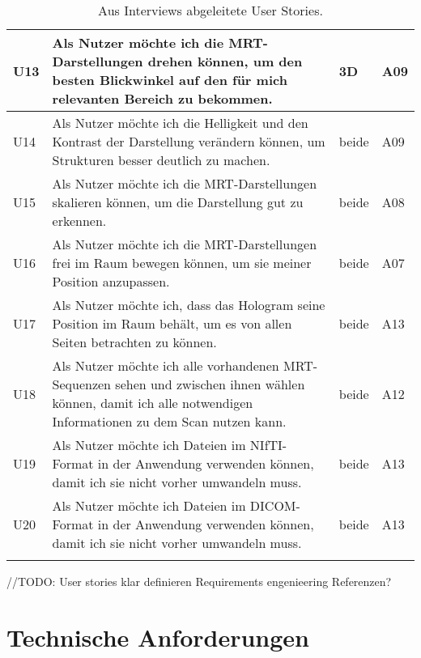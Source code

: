 \begin{longtable} {p{}p{}p{}p{}}
\midrule 
U13 & Als Nutzer möchte ich die MRT-Darstellungen drehen können, um den besten Blickwinkel auf den für mich relevanten Bereich zu bekommen. & 3D & A09\\
\midrule 
U14 & Als Nutzer möchte ich die Helligkeit und den Kontrast der Darstellung verändern können, um Strukturen besser deutlich zu machen. & beide & A09\\
\midrule 
U15 & Als Nutzer möchte ich die MRT-Darstellungen skalieren können, um die Darstellung gut zu erkennen. & beide & A08\\
\midrule 
U16 & Als Nutzer möchte ich die MRT-Darstellungen frei im Raum bewegen können, um sie meiner Position anzupassen. & beide & A07\\
\midrule 
U17 & Als Nutzer möchte ich, dass das Hologram seine Position im Raum behält, um es von allen Seiten betrachten zu können. & beide & A13\\
\midrule 
U18 & Als Nutzer möchte ich alle vorhandenen MRT-Sequenzen sehen und zwischen ihnen wählen können, damit ich alle notwendigen Informationen zu dem Scan nutzen kann. & beide & A12\\
\midrule 
U19 & Als Nutzer möchte ich Dateien im NIfTI-Format in der Anwendung verwenden können, damit ich sie nicht vorher umwandeln muss. & beide & A13\\
\midrule 
U20 & Als Nutzer möchte ich Dateien im DICOM-Format in der Anwendung verwenden können, damit ich sie nicht vorher umwandeln muss. & beide & A13\\

\bottomrule
\caption{\label{tab:userStories}Aus Interviews abgeleitete User Stories.}
\end{longtable}

//TODO:
User stories klar definieren
Requirements engenieering 
Referenzen?


\section{Technische Anforderungen}

